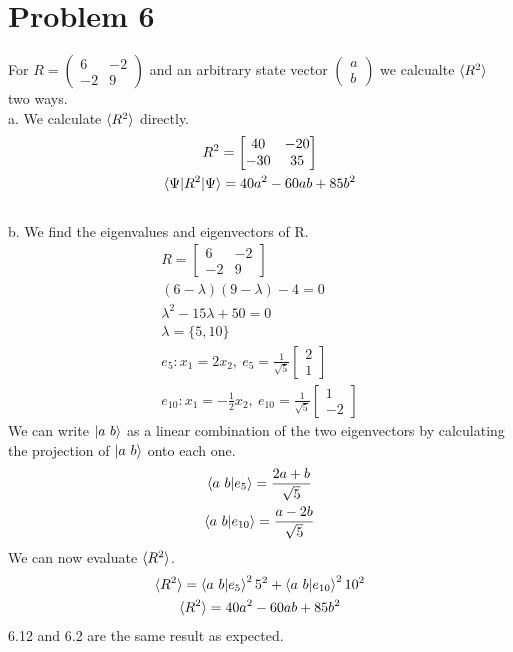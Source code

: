 \documentclass[a4paper,12pt]{article}
\numberwithin{equation}{section}
\begin{document}
\section{Problem 6}
For $R=\left( \begin{smallmatrix}6&-2\\-2&9\end{smallmatrix} \right)$ and an arbitrary state vector $\left( \begin{smallmatrix}a\\b\end{smallmatrix} \right)$ we calcualte $\braket{R^2}$ two ways.\\
a. We calculate $\braket{R^2}$ directly.
\begin{gather}
 R^2=\begin{bmatrix}40&-20\\-30&35 \end{bmatrix}\\
 \braket{\Psi|R^2|\Psi}=40a^2-60ab+85b^2
\end{gather}
\\
b. We find the eigenvalues and eigenvectors of R.
\begin{gather}
 R= \begin{bmatrix}6&-2\\-2&9\end{bmatrix}\\
 (6-\lambda)(9-\lambda)-4=0\\
 \lambda^2-15\lambda+50=0\\
 \lambda=\{5,10\}\\
 e_{5}:x_1=2x_2,\ e_5= \frac{1}{\sqrt{5}}\begin{bmatrix}2\\1\end{bmatrix}\\
 e_{10}:x_1=-\frac{1}{2}x_2,\ e_10= \frac{1}{\sqrt{5}}\begin{bmatrix}1\\-2\end{bmatrix}
\end{gather}
We can write $\ket{a\ b}$ as a linear combination of the two eigenvectors by calculating the projection of $\ket{a\ b}$ onto each one.
\begin{gather}
 \braket{a\ b|e_5}=\frac{2a+b}{\sqrt{5}}\\
 \braket{a\ b|e_{10}}=\frac{a-2b}{\sqrt{5}}
\end{gather}
We can now evaluate $\braket{R^2}$.
\begin{gather}
 \braket{R^2}=\braket{a\ b|e_5}^25^2+\braket{a\ b|e_{10}}^210^2\\
 \braket{R^2}=40a^2-60ab+85b^2
\end{gather}
6.12 and 6.2 are the same result as expected.
\end{document}
